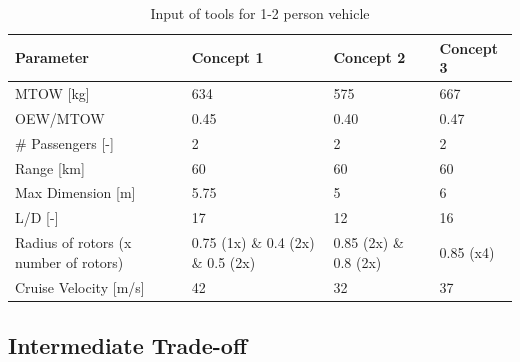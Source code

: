 \begin{table}[H]
\captionsetup{justification=centering}
\caption{Input of tools for 1-2 person vehicle}
\label{12input}
\begin{tabular}{@{}llll@{}}
\toprule
\textbf{Parameter}                       & \textbf{Concept 1} & \textbf{Concept 2} & \textbf{Concept 3} \\ \midrule
MTOW {[}kg{]}                            &           634         &        575           &         667           \\
OEW/MTOW           &          0.45          &         0.40          &             0.47       \\
\# Passengers {[}-{]}                    &          2          &         2           &             2       \\
Range {[}km{]}                           &          60          &         60     &            60        \\
Max Dimension {[}m{]}                    &         5.75           &          5          &            6        \\
L/D {[}-{]}                              &           17         &        12            &           16         \\
Radius of rotors (x number of rotors) &   0.75 (1x) \& 0.4 (2x) \& 0.5 (2x)                &    0.85 (2x) \& 0.8 (2x)&            0.85 (x4)       \\
Cruise Velocity {[}m/s{]}                &          42          &        32            &            37        \\ \bottomrule
\end{tabular}

\end{table}


\subsection{Intermediate Trade-off}

